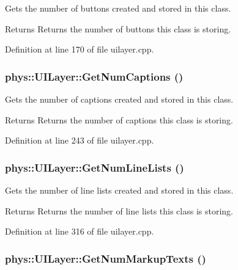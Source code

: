 Gets the number of buttons created and stored in this class. 

\begin{DoxyReturn}{Returns}
Returns the number of buttons this class is storing. 
\end{DoxyReturn}


Definition at line 170 of file uilayer.cpp.

\hypertarget{classphys_1_1UILayer_a76b9f48b8b40c4e933dc1f3cf624ffbc}{
\subsubsection[{GetNumCaptions}]{ phys::UILayer::GetNumCaptions ()}}
\label{da/d48/classphys_1_1UILayer_a76b9f48b8b40c4e933dc1f3cf624ffbc}


Gets the number of captions created and stored in this class. 

\begin{DoxyReturn}{Returns}
Returns the number of captions this class is storing. 
\end{DoxyReturn}


Definition at line 243 of file uilayer.cpp.

\hypertarget{classphys_1_1UILayer_a746f83b806660debc3104fd90dc57d32}{
\subsubsection[{GetNumLineLists}]{ phys::UILayer::GetNumLineLists ()}}
\label{da/d48/classphys_1_1UILayer_a746f83b806660debc3104fd90dc57d32}


Gets the number of line lists created and stored in this class. 

\begin{DoxyReturn}{Returns}
Returns the number of line lists this class is storing. 
\end{DoxyReturn}


Definition at line 316 of file uilayer.cpp.

\hypertarget{classphys_1_1UILayer_a80f4761638d701d8767ad1c0f769985a}{
\subsubsection[{GetNumMarkupTexts}]{ phys::UILayer::GetNumMarkupTexts ()}}
\label{da/d48/classphys_1_1UILayer_a80f4761638d701d8767ad1c0f769985a}


